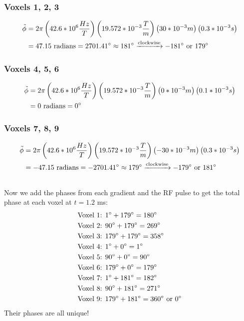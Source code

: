 \documentclass{article}
\begin{document}
\subsubsection*{Voxels 1, 2, 3}
\begin{align*}
    \tilde{\phi} &= 
    2\pi \left(42.6 * 10^{6} \frac{Hz}{T}\right)
    \left(19.572 * 10^{-3} \frac{T}{m} \right)
    \left(30 * 10^{-3} m \right)
    \left(0.3 * 10^{-3} s \right) \\
    &= 47.15 \textrm{ radians} = 2701.41\degree \approx 181\degree \xrightarrow{\text{clockwise}} -181\degree \textrm{ or } 179\degree
\end{align*}
\subsubsection*{Voxels 4, 5, 6}
\begin{align*}
    \tilde{\phi} &= 
    2\pi \left(42.6 * 10^{6} \frac{Hz}{T}\right)
    \left(19.572 * 10^{-3} \frac{T}{m} \right)
    \left(0 * 10^{-3} m \right)
    \left(0.1 * 10^{-3} s \right) \\
    &= 0 \textrm{ radians} = 0\degree
\end{align*}
\subsubsection*{Voxels 7, 8, 9}
\begin{align*}
    \tilde{\phi} &= 
    2\pi \left(42.6 * 10^{6} \frac{Hz}{T}\right)
    \left(19.572 * 10^{-3} \frac{T}{m} \right)
    \left(-30 * 10^{-3} m \right)
    \left(0.3 * 10^{-3} s \right) \\
    &= -47.15 \textrm{ radians} = -2701.41\degree \approx 179\degree \xrightarrow{\text{clockwise}} -179\degree \textrm{ or } 181\degree
\end{align*}
\subsection*{}
Now we add the phases from each gradient and the RF pulse to get the total phase at each voxel at $t = 1.2$ ms:
\begin{align*}
    &\textrm{Voxel 1: } 1\degree + 179\degree = 180\degree \\
    &\textrm{Voxel 2: } 90\degree + 179\degree = 269\degree \\
    &\textrm{Voxel 3: } 179\degree + 179\degree = 358\degree \\
    &\textrm{Voxel 4: } 1\degree + 0\degree = 1\degree \\
    &\textrm{Voxel 5: } 90\degree + 0\degree = 90\degree \\
    &\textrm{Voxel 6: } 179\degree + 0\degree = 179\degree \\
    &\textrm{Voxel 7: } 1\degree + 181\degree = 182\degree \\
    &\textrm{Voxel 8: } 90\degree + 181\degree = 271\degree \\
    &\textrm{Voxel 9: } 179\degree + 181\degree = 360\degree \textrm{ or } 0\degree
\end{align*}
Their phases are all unique!
\end{document}
